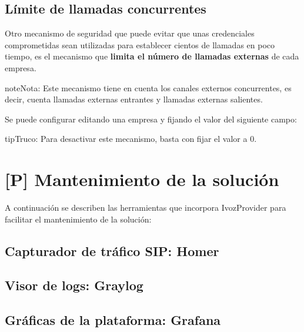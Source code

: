 \documentclass[letterpaper,10pt,spanish]{sphinxmanual}
\begin{document}
\noindent{}


\section{Límite de llamadas concurrentes}
\label{security/index:limite-de-llamadas-concurrentes}
Otro mecanismo de seguridad que puede evitar que unas credenciales comprometidas sean utilizadas para establecer cientos de llamadas en poco tiempo, es el mecanismo que \textbf{limita el número de llamadas externas} de cada empresa.

\begin{notice}{note}{Nota:}
Este mecanismo tiene en cuenta los canales externos concurrentes, es decir, cuenta llamadas externas entrantes y llamadas externas salientes.
\end{notice}

Se puede configurar editando una empresa y fijando el valor del siguiente campo:


\begin{notice}{tip}{Truco:}
Para desactivar este mecanismo, basta con fijar el valor a 0.
\end{notice}


\chapter{{[}P{]} Mantenimiento de la solución}
\label{maintenance/index:p-mantenimiento-de-la-solucion}\label{maintenance/index::doc}
A continuación se describen las herramientas que incorpora IvozProvider para facilitar el mantenimiento de la solución:


\section{Capturador de tráfico SIP: Homer}
\label{maintenance/sip_captures:capturador-de-trafico-sip-homer}\label{maintenance/sip_captures::doc}

\section{Visor de logs: Graylog}
\label{maintenance/log_viewer:visor-de-logs-graylog}\label{maintenance/log_viewer::doc}

\section{Gráficas de la plataforma: Grafana}
\label{maintenance/platform_graphs::doc}\label{maintenance/platform_graphs:graficas-de-la-plataforma-grafana}


\renewcommand{\indexname}{Índice}
\printindex
\end{document}
